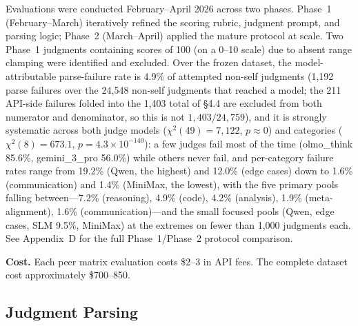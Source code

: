 \documentclass{article}
\begin{document}
Evaluations were conducted February--April 2026 across two phases. Phase~1 (February--March) iteratively refined the scoring rubric, judgment prompt, and parsing logic; Phase~2 (March--April) applied the mature protocol at scale. Two Phase~1 judgments containing scores of 100 (on a 0--10 scale) due to absent range clamping were identified and excluded. Over the frozen dataset, the model-attributable parse-failure rate is 4.9\% of attempted non-self judgments (1{,}192 parse failures over the 24{,}548 non-self judgments that reached a model; the 211 API-side failures folded into the 1{,}403 total of \S4.4 are excluded from both numerator and denominator, so this is not $1{,}403/24{,}759$), and it is strongly systematic across both judge models ($\chi^2(49) = 7{,}122$, $p \approx 0$) and categories ($\chi^2(8) = 673.1$, $p = 4.3 \times 10^{-140}$): a few judges fail most of the time (olmo\_think 85.6\%, gemini\_3\_pro 56.0\%) while others never fail, and per-category failure rates range from 19.2\% (Qwen, the highest) and 12.0\% (edge cases) down to 1.6\% (communication) and 1.4\% (MiniMax, the lowest), with the five primary pools falling between---7.2\% (reasoning), 4.9\% (code), 4.2\% (analysis), 1.9\% (meta-alignment), 1.6\% (communication)---and the small focused pools (Qwen, edge cases, SLM 9.5\%, MiniMax) at the extremes on fewer than 1{,}000 judgments each. See Appendix~D for the full Phase~1/Phase~2 protocol comparison.

\textbf{Cost.} Each peer matrix evaluation costs \$2--3 in API fees. The complete dataset cost approximately \$700--850.

\subsection{Judgment Parsing}
\end{document}
